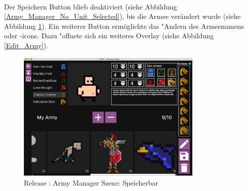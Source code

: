 \documentclass[12pt, titlepage]{scrartcl}
\newcommand{\RN}[1]{%
	\textup{\uppercase\expandafter{\romannumeral#1}}%
}
\begin{document}
                \ \\ Der Speichern Button blieb deaktiviert (siehe Abbildung \ref{Army_Manager_No_Unit_Selected}), bis die Armee ver\"andert wurde (siehe Abbildung \ref{Army_Manager_Ready_To_Save}). Ein weiterer Button erm\"oglichte das "Andern des Armeenamens oder -icons. Dazu "offnete sich ein weiteres Overlay (siehe Abbildung \ref{Edit_Army}). \\
                \begin{figure}[H] 
    				\centering
    				\includegraphics[width=0.8\textwidth]{images/old_state/army_manager/ArmyReadyToSave.png}
    				\caption{Release \RN{2}: Army Manager Szene: Speicherbar}
    				\label{Army_Manager_Ready_To_Save}
			    \end{figure}
\end{document}
